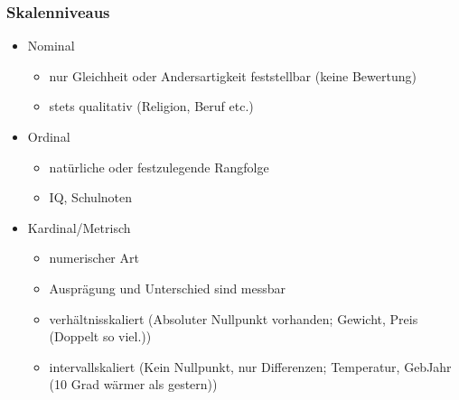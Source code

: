 \documentclass[a4paper]{article}
\begin{document}
\begin{landscape}
\begin{multicols}{4}
    \subsubsection*{Skalenniveaus}
    \begin{itemize}[noitemsep,nolistsep,leftmargin=*]
        \item Nominal
        \begin{itemize}[noitemsep,nolistsep,leftmargin=*]
            \item nur Gleichheit oder Andersartigkeit feststellbar (keine Bewertung)
            \item stets qualitativ (Religion, Beruf etc.)
        \end{itemize}
        \item Ordinal
        \begin{itemize}[noitemsep,nolistsep,leftmargin=*]
            \item natürliche oder festzulegende Rangfolge
            \item IQ, Schulnoten
        \end{itemize}
        \item Kardinal/Metrisch
        \begin{itemize}[noitemsep,nolistsep,leftmargin=*]
            \item numerischer Art 
            \item Ausprägung und Unterschied sind messbar
            \item verhältnisskaliert (Absoluter Nullpunkt vorhanden; Gewicht, Preis (Doppelt so viel.))
            \item intervallskaliert (Kein Nullpunkt, nur Differenzen; Temperatur, GebJahr (10 Grad wärmer als gestern))
        \end{itemize}
    \end{itemize}

\end{multicols}
\end{landscape}
\end{document}
